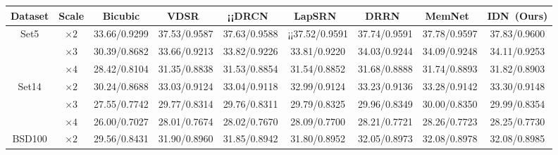 \documentclass[10pt,twocolumn,letterpaper]{article}
\begin{document}
\begin{table*}[htp]
	\small \begin{center}
		\begin{tabular}{|c|c|c|c|c|c|c|c||c|}
			\hline
			Dataset & Scale & Bicubic & VDSR~\cite{VDSR} &¡¡DRCN~\cite{DRCN} & LapSRN~\cite{LapSRN} & DRRN~\cite{DRRN} & MemNet~\cite{MemNet} & IDN~(Ours) \\
			\hline
			\hline
			\multirow{3}{*}{Set5} & $\times 2$ & 33.66/0.9299 & 37.53/0.9587 & 37.63/0.9588 &¡¡37.52/0.9591 & 37.74/0.9591 & \textcolor[rgb]{0.00,0.07,1.00}{37.78}/\textcolor[rgb]{0.00,0.07,1.00}{0.9597} & \textcolor[rgb]{1.00,0.00,0.00}{37.83}/\textcolor[rgb]{1.00,0.00,0.00}{0.9600} \\
			
			& $\times 3$ & 30.39/0.8682 & 33.66/0.9213 & 33.82/0.9226 & 33.81/0.9220 & 34.03/0.9244 & \textcolor[rgb]{0.00,0.07,1.00}{34.09}/\textcolor[rgb]{0.00,0.07,1.00}{0.9248} & \textcolor[rgb]{1.00,0.00,0.00}{34.11}/\textcolor[rgb]{1.00,0.00,0.00}{0.9253} \\
			
			& $\times 4$ & 28.42/0.8104 & 31.35/0.8838 & 31.53/0.8854 & 31.54/0.8852 & 31.68/0.8888 & \textcolor[rgb]{0.00,0.07,1.00}{31.74}/\textcolor[rgb]{0.00,0.07,1.00}{0.8893} & \textcolor[rgb]{1.00,0.00,0.00}{31.82}/\textcolor[rgb]{1.00,0.00,0.00}{0.8903} \\
			\hline
			\hline
			\multirow{3}{*}{Set14} & $\times 2$ & 30.24/0.8688 & 33.03/0.9124 & 33.04/0.9118 & 32.99/0.9124 & 33.23/0.9136 & \textcolor[rgb]{0.00,0.07,1.00}{33.28}/\textcolor[rgb]{0.00,0.07,1.00}{0.9142} & \textcolor[rgb]{1.00,0.00,0.00}{33.30}/\textcolor[rgb]{1.00,0.00,0.00}{0.9148} \\
			
			& $\times 3$ & 27.55/0.7742 & 29.77/0.8314 & 29.76/0.8311 & 29.79/0.8325 & 29.96/0.8349 & \textcolor[rgb]{1.00,0.00,0.00}{30.00}/\textcolor[rgb]{0.00,0.07,1.00}{0.8350} & \textcolor[rgb]{0.00,0.07,1.00}{29.99}/\textcolor[rgb]{1.00,0.00,0.00}{0.8354} \\
			
			& $\times 4$ & 26.00/0.7027 & 28.01/0.7674 & 28.02/0.7670 & 28.09/0.7700 & 28.21/0.7721 & \textcolor[rgb]{1.00,0.00,0.00}{28.26}/\textcolor[rgb]{0.00,0.07,1.00}{0.7723} & \textcolor[rgb]{0.00,0.07,1.00}{28.25}/\textcolor[rgb]{1.00,0.00,0.00}{0.7730} \\
			
			\hline
			\hline
			\multirow{3}{*}{BSD100} & $\times 2$ & 29.56/0.8431 & 31.90/0.8960 & 31.85/0.8942 & 31.80/0.8952 & \textcolor[rgb]{0.00,0.07,1.00}{32.05}/0.8973 & \textcolor[rgb]{1.00,0.00,0.00}{32.08}/\textcolor[rgb]{0.00,0.07,1.00}{0.8978} & \textcolor[rgb]{1.00,0.00,0.00}{32.08}/\textcolor[rgb]{1.00,0.00,0.00}{0.8985} \\
			

\end{tabular}
\end{center}
\end{table*}
\end{document}
